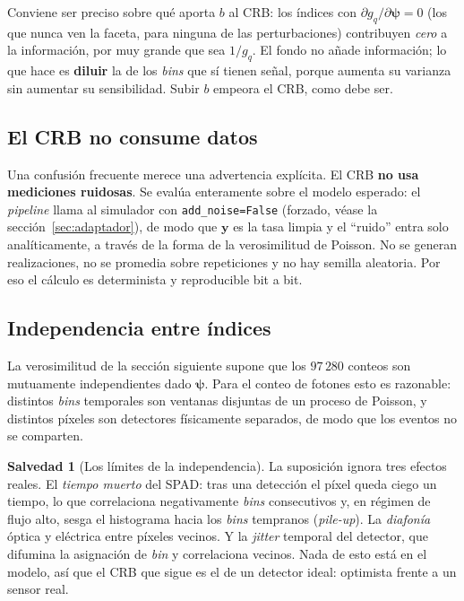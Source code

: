 \documentclass[11pt,a4paper]{article}
\newcommand{\vect}[1]{\boldsymbol{#1}}
\newcommand{\code}[1]{\texttt{#1}}
\theoremstyle{definition}
\newtheorem{salvedad}{Salvedad}
\theoremstyle{plain}
\begin{document}
Conviene ser preciso sobre qué aporta $b$ al CRB: los índices con
$\partial g_q/\partial\vect\psi=0$ (los que nunca ven la faceta, para ninguna de
las perturbaciones) contribuyen \emph{cero} a la información, por muy grande que
sea $1/g_q$. El fondo no añade información; lo que hace es \textbf{diluir} la de
los \emph{bins} que sí tienen señal, porque aumenta su varianza sin aumentar su
sensibilidad. Subir $b$ empeora el CRB, como debe ser.

\subsection{El CRB no consume datos}

Una confusión frecuente merece una advertencia explícita. El CRB
\textbf{no usa mediciones ruidosas}. Se evalúa enteramente sobre el modelo
esperado: el \emph{pipeline} llama al simulador con \code{add\_noise=False}
(forzado, véase la sección~\ref{sec:adaptador}), de modo que $\vect y$ es la
tasa limpia y el \enquote{ruido} entra solo analíticamente, a través de la forma
de la verosimilitud de Poisson. No se generan realizaciones, no se promedia
sobre repeticiones y no hay semilla aleatoria. Por eso el cálculo es
determinista y reproducible bit a bit.

\subsection{Independencia entre índices}

La verosimilitud de la sección siguiente supone que los $97\,280$ conteos son
mutuamente independientes dado $\vect\psi$. Para el conteo de fotones esto es
razonable: distintos \emph{bins} temporales son ventanas disjuntas de un proceso
de Poisson, y distintos píxeles son detectores físicamente separados, de modo
que los eventos no se comparten.

\begin{salvedad}[Los límites de la independencia]
La suposición ignora tres efectos reales. El \emph{tiempo muerto} del SPAD:
tras una detección el píxel queda ciego un tiempo, lo que correlaciona
negativamente \emph{bins} consecutivos y, en régimen de flujo alto, sesga el
histograma hacia los \emph{bins} tempranos (\emph{pile-up}). La \emph{diafonía}
óptica y eléctrica entre píxeles vecinos. Y la \emph{jitter} temporal del
detector, que difumina la asignación de \emph{bin} y correlaciona vecinos. Nada
de esto está en el modelo, así que el CRB que sigue es el de un detector ideal:
optimista frente a un sensor real.
\end{salvedad}
\end{document}
